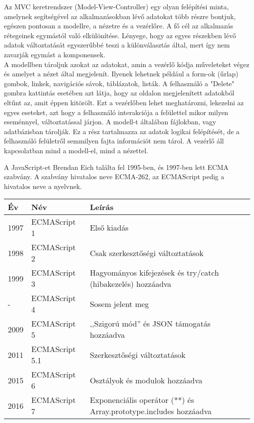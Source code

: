 

Az MVC keretrendszer (Model-View-Controller) egy olyan felépítési minta, amelynek segítségével az alkalmazásokban lévő adatokat több részre bontjuk, egészen pontosan a modellre, a nézetre és a vezérlőre. A fő cél az alkalmazás rétegeinek egymástól való elkülönítése. Lényege, hogy az egyes részekben lévő adatok változtatását egyszerűbbé teszi a különválasztás által, mert így nem zavarják egymást a komponensek. \\A modellben tároljuk azokat az adatokat, amin a vezérlő kódja műveleteket végez és amelyet a nézet által megjelenít. Ilyenek lehetnek például a form-ok (űrlap) gombok, linkek, navigációs sávok, táblázatok, listák. A felhasználó a "Delete" gombra kattintás esetében azt látja, hogy az oldalon megjelenített adatokból eltűnt az, amit éppen kitörölt. Ezt a vezérlőben lehet meghatározni, lekezelni az egyes eseteket, azt hogy a felhasználó interakciója a felülettel mikor milyen eseménnyel, változtatással járjon. A modell-t általában fájlokban, vagy adatbázisban tárolják. Ez a rész tartalmazza az adatok logikai felépítését, de a felhasználó felületről semmilyen fajta információt nem tárol. A vezérlő áll kapcsolatban mind a modell-el, mind a nézettel.



A JavaScript-et Brendan Eich találta fel 1995-ben, és 1997-ben lett ECMA szabvány.
A szabvány hivatalos neve ECMA-262, az ECMAScript pedig a hivatalos neve a nyelvnek.

\begin{tabular}{|l|l|p{8cm}|}
\hline
\textbf{Év} & \textbf{Név} & \textbf{Leírás} \\
\hline
1997 & ECMAScript 1 & Első kiadás \\
\hline
1998 & ECMAScript 2 & Csak szerkesztőségi változtatások \\
\hline
1999 & ECMAScript 3 & Hagyományos kifejezések és try/catch (hibakezelés) hozzáadva \\
\hline
- & ECMAScript 4 & Sosem jelent meg \\
\hline
2009 & ECMAScript 5 & ,,Szigorú mód'' és JSON támogatás hozzáadva \\
\hline
2011 & ECMAScript 5.1 & Szerkesztőségi változtatások \\
\hline
2015 & ECMAScript 6 & Osztályok és modulok hozzáadva \\
\hline
2016 & ECMAScript 7 & Exponenciális operátor (**) és Array.prototype.includes hozzáadva \\
\hline
\end{tabular}
\\

